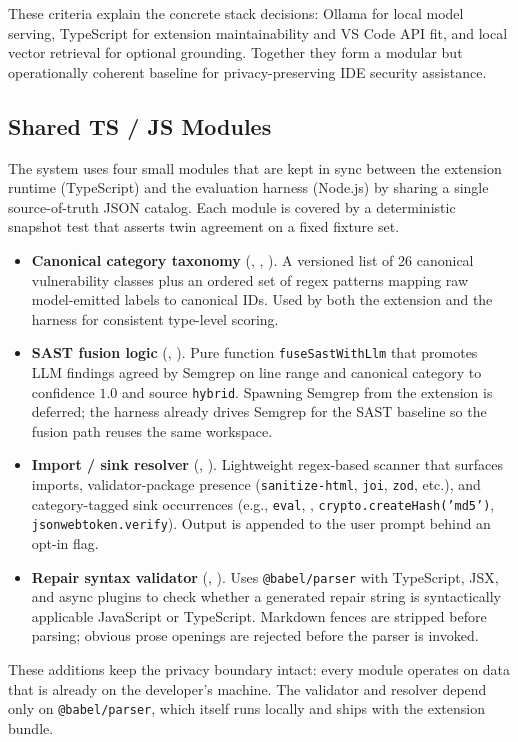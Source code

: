 These criteria explain the concrete stack decisions: Ollama for local model serving, TypeScript for extension maintainability and VS Code API fit, and local vector retrieval for optional grounding. Together they form a modular but operationally coherent baseline for privacy-preserving IDE security assistance.

\subsection*{Shared TS / JS Modules}

The system uses four small modules that are kept in sync between the extension runtime (TypeScript) and the evaluation harness (Node.js) by sharing a single source-of-truth JSON catalog. Each module is covered by a deterministic snapshot test that asserts twin agreement on a fixed fixture set.

\begin{itemize}
  \item \textbf{Canonical category taxonomy} (, , ). A versioned list of 26 canonical vulnerability classes plus an ordered set of regex patterns mapping raw model-emitted labels to canonical IDs. Used by both the extension and the harness for consistent type-level scoring.
  \item \textbf{SAST fusion logic} (, ). Pure function \texttt{fuseSastWithLlm} that promotes LLM findings agreed by Semgrep on line range and canonical category to confidence $1.0$ and source \texttt{hybrid}. Spawning Semgrep from the extension is deferred; the harness already drives Semgrep for the SAST baseline so the fusion path reuses the same workspace.
  \item \textbf{Import / sink resolver} (, ). Lightweight regex-based scanner that surfaces imports, validator-package presence (\texttt{sanitize-html}, \texttt{joi}, \texttt{zod}, etc.), and category-tagged sink occurrences (e.g., \texttt{eval}, , \texttt{crypto.createHash('md5')}, \texttt{jsonwebtoken.verify}). Output is appended to the user prompt behind an opt-in flag.
  \item \textbf{Repair syntax validator} (, ). Uses \texttt{@babel/parser} with TypeScript, JSX, and async plugins to check whether a generated repair string is syntactically applicable JavaScript or TypeScript. Markdown fences are stripped before parsing; obvious prose openings are rejected before the parser is invoked.
\end{itemize}

These additions keep the privacy boundary intact: every module operates on data that is already on the developer's machine. The validator and resolver depend only on \texttt{@babel/parser}, which itself runs locally and ships with the extension bundle.

